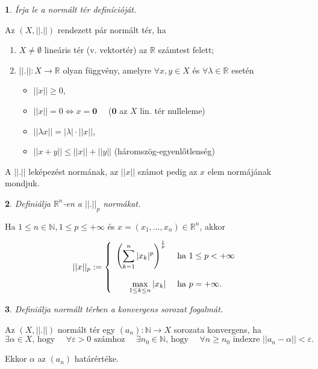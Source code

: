 \documentclass[a4paper]{article}
\def\R{\mathbb{R}}
\def\N{\mathbb{N}}
\theoremstyle{qstyle}
\newtheorem{question}{}{}
\begin{document}
	\begin{question}
		Írja le a normált tér definícióját.
	\end{question}
	Az $(X,||.||)$ rendezett pár normált tér, ha
	\vspace{-4mm}
	\begin{enumerate}
		\item $X \ne \emptyset$ lineáris tér (v. vektortér) az $\R$ számtest felett;
		\item $||.|| : X\to  \R$ olyan függvény, amelyre $\forall x,y \in X$ és $\forall \lambda \in \R$ esetén
		\begin{itemize}
			\item $||x||\ge 0$,
			\item $||x|| = 0 \Leftrightarrow x = \boldsymbol{0} \quad$ ($\boldsymbol{0}$ az $X$ lin. tér nulleleme)
			\item $||\lambda x|| = |\lambda | \cdot ||x||$,
			\item $||x+y|| \le ||x||+||y||$ (háromszög-egyenlőtlenség)
		\end{itemize}
	\end{enumerate}
	\vspace{-4mm}
	A $||.||$ leképezést normának, az $||x||$ számot pedig az $x$ elem normájának mondjuk.
	
	\begin{question}
		Definiálja $\R^n$-en a $||.||_p$ normákat.
	\end{question}
	Ha $1\le n\in\N, 1\le p\le +\infty$ és $x = (x_1,\dots,x_n) \in \R^n$, akkor
	
	$$
	||x||_p := 
	\left\{\begin{array}{rl}
	\left(\mathlarger{\sum_{k=1}^{n}|x_k|^p} \right)^{\frac{1}{p}} & \text{ ha } 1\le p < +\infty \\
	&\\
	\max\limits_{1 \le k\le n} |x_k| & \text{ ha } p = +\infty\text{.} 
	\end{array}\right.
	$$
	
	\begin{question}
		Definiálja normált térben a konvergens sorozat fogalmát.
	\end{question}
	Az $(X,||.||)$ normált tér egy $(a_n):\N\to X$ sorozata konvergens, ha
	$$\exists \alpha\in X \text{, hogy }\quad \forall \varepsilon > 0 \text{ számhoz } \quad \exists n_0 \in \N \text{, hogy } \quad \forall n\ge n_0 \text{ indexre } ||a_n-\alpha|| < \varepsilon \text{.}$$
	
	Ekkor $\alpha$ az $(a_n)$ határértéke.
	
\end{document}
